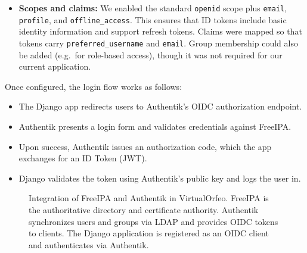 \begin{itemize}
	\item \textbf{Scopes and claims:}  
	We enabled the standard \texttt{openid} scope plus \texttt{email}, 
	\texttt{profile}, and \texttt{offline\_access}. This ensures that ID tokens 
	include basic identity information and support refresh tokens. Claims were 
	mapped so that tokens carry \texttt{preferred\_username} and \texttt{email}. 
	Group membership could also be added (e.g.\ for role-based access), though it 
	was not required for our current application.  
\end{itemize}

\medskip

Once configured, the login flow works as follows:  
\begin{itemize}
	\item The Django app redirects users to Authentik’s OIDC authorization 
	endpoint.  
	\item Authentik presents a login form and validates credentials against 
	FreeIPA.  
	\item Upon success, Authentik issues an authorization code, which the app 
	exchanges for an ID Token (JWT).  
	\item Django validates the token using Authentik’s public key and logs the 
	user in.  
\end{itemize}

\begin{figure}[h]
	\centering
	\caption{Integration of FreeIPA and Authentik in VirtualOrfeo. 
		FreeIPA is the authoritative directory and certificate authority. 
		Authentik synchronizes users and groups via LDAP and provides OIDC tokens to clients. 
		The Django application is registered as an OIDC client and authenticates via Authentik.}
	\label{fig:freeipa-authentik}
\end{figure}

